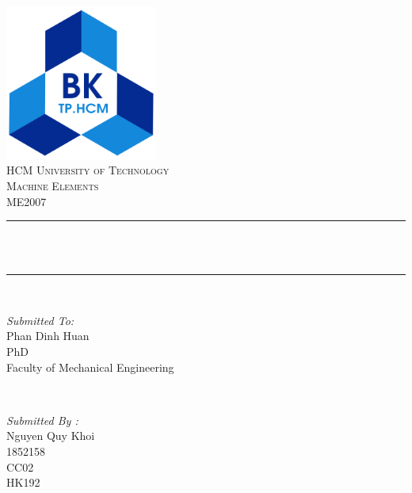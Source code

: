 \documentclass{presets}
\begin{document}
	\begin{titlepage}
		\centering
		\includegraphics[width=5cm]{logo.png}\\[1.0 cm]	%
		\textsc{\LARGE HCM University of Technology}\\[1cm] %
		\textsc{\Large Machine Elements}\\[0.5cm] %
		\textsc{\Large ME2007}\\[0.5 cm]				%
		\rule{\linewidth}{0.2 mm} \\[0.4 cm]
		{ \huge \bfseries \thetitle}\\
		\rule{\linewidth}{0.2 mm} \\[1.5 cm]
		
		\begin{minipage}{0.4\textwidth}
			\begin{flushleft} \large
				\emph{Submitted To:}\\
				Phan Dinh Huan\\
				PhD\\
				Faculty of Mechanical Engineering\\
			\end{flushleft}
		\end{minipage}~
		\begin{minipage}{0.4\textwidth}
			
			\begin{flushright} \large
				\emph{Submitted By :} \\
				Nguyen Quy Khoi\\
				1852158\\
				CC02\\
				HK192\\
			\end{flushright}
			
		\end{minipage}\\[2 cm]
		
	\end{titlepage}
	\tableofcontents
	\listoftables
	\listoffigures
	
	
%	
%	
\end{document}
